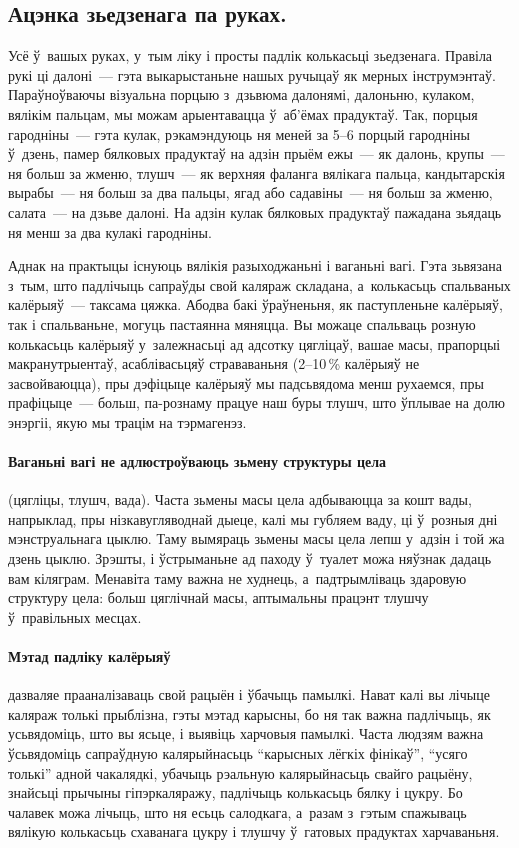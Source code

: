 \subsection*{Ацэнка зьедзенага па руках.}
Усё ў~вашых руках, у~тым ліку і просты падлік колькасьці зьедзенага. Правіла рукі ці далоні~--- гэта выкарыстаньне нашых ручыцаў як мерных інструмэнтаў. Параўноўваючы візуальна порцыю з~дзьвюма далонямі, далоньню, кулаком, вялікім пальцам, мы можам арыентавацца ў~аб'ёмах прадуктаў. Так, порцыя гародніны~--- гэта кулак, рэкамэндуюць ня меней за 5--6 порцый гародніны ў~дзень, памер бялковых прадуктаў на адзін прыём ежы~--- як далонь, крупы~--- ня больш за жменю, тлушч~--- як верхняя фаланга вялікага пальца, кандытарскія вырабы~--- ня больш за два пальцы, ягад або садавіны~--- ня больш за жменю, салата~--- на дзьве далоні. На адзін кулак бялковых прадуктаў пажадана зьядаць ня менш за два кулакі гародніны.

Аднак на практыцы існуюць вялікія разыходжаньні і ваганьні вагі. Гэта зьвязана з~тым, што падлічыць сапраўды свой каляраж складана, а~колькасьць спальваных калёрыяў~--- таксама цяжка. Абодва бакі ўраўненьня, як паступленьне калёрыяў, так і спальваньне, могуць пастаянна мяняцца. Вы можаце спальваць розную колькасьць калёрыяў у~залежнасьці ад адсотку цягліцаў, вашае масы, прапорцыі макранутрыентаў, асаблівасьцяў страваваньня (2--10\,\% калёрыяў не засвойваюцца), пры дэфіцыце калёрыяў мы падсьвядома менш рухаемся, пры прафіцыце~--- больш, па-рознаму працуе наш буры тлушч, што ўплывае на долю энэргіі, якую мы трацім на тэрмагенэз.

\paragraph{Ваганьні вагі не адлюстроўваюць зьмену структуры цела} (цягліцы, тлушч, вада). Часта зьмены масы цела адбываюцца за кошт вады, напрыклад, пры нізкавугляводнай дыеце, калі мы губляем ваду, ці ў~розныя дні мэнструальнага цыклю. Таму вымяраць зьмены масы цела лепш у~адзін і той жа дзень цыклю. Зрэшты, і ўстрыманьне ад паходу ў~туалет можа няўзнак дадаць вам кіляграм. Менавіта таму важна не худнець, а~падтрымліваць здаровую структуру цела: больш цяглічнай масы, аптымальны працэнт тлушчу ў~правільных месцах.

\paragraph{Мэтад падліку калёрыяў} дазваляе прааналізаваць свой рацыён і ўбачыць памылкі. Нават калі вы лічыце каляраж толькі прыблізна, гэты мэтад карысны, бо ня так важна падлічыць, як усьвядоміць, што вы ясьце, і выявіць харчовыя памылкі. Часта людзям важна ўсьвядоміць сапраўдную калярыйнасьць ``карысных лёгкіх фінікаў'', ``усяго толькі'' адной чакалядкі, убачыць рэальную калярыйнасьць свайго рацыёну, знайсьці прычыны гіпэркаляражу, падлічыць колькасьць бялку і цукру. Бо чалавек можа лічыць, што ня есьць салодкага, а~разам з~гэтым спажываць вялікую колькасьць схаванага цукру і тлушчу ў~гатовых прадуктах харчаваньня.

